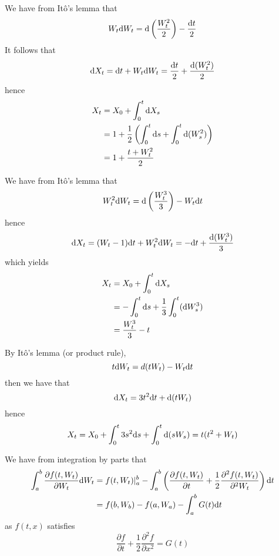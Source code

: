 \documentclass{homework}
\begin{document}
    \problem
    \begin{subproblem}[(\alph*)]
        \item
        We have from It\^o's lemma that
        \[W_t\mathrm d W_t=\mathrm d\left(\frac{W_t^2}{2}\right)-\frac{\mathrm d t}{2}\]
        It follows that
        \[\mathrm d X_t=\mathrm d t+W_t\mathrm d W_t=\frac{\mathrm d t}{2}+\frac{\mathrm d (W_t^2)}{2}\]
        hence
        \[\begin{aligned}
            X_t&=X_0+\int_0^t\mathrm d X_s\\
            &=1+\frac{1}{2}\left(\int_0^t\mathrm d s+\int_0^t\mathrm d(W_s^2)\right)\\
            &=1+\frac{t+W_t^2}{2}
        \end{aligned}\]

        \item
        We have from It\^o's lemma that
        \[W_t^2\mathrm d W_t=\mathrm d\left(\frac{W_t^3}{3}\right)-W_t\mathrm d t\]
        hence
        \[\mathrm d X_t=(W_t-1)\mathrm d t+W_t^2\mathrm d W_t=-\mathrm d t+\frac{\mathrm d(W_t^3)}{3}\]
        which yields
        \[\begin{aligned}
            X_t&=X_0+\int_0^t\mathrm d X_s\\
            &=-\int_0^t\mathrm d s+\frac{1}{3}\int_0^t(\mathrm d W_s^3)\\
            &=\frac{W_t^3}{3}-t
        \end{aligned}\]

        \item
        By It\^o's lemma (or product rule),
        \[t\mathrm d W_t=d(tW_t)-W_t\mathrm d t\]
        then we have that
        \[\mathrm d X_t=3t^2\mathrm d t+\mathrm d(tW_t)\]
        hence
        \[X_t=X_0+\int_0^t3s^2\mathrm d s+\int_0^t\mathrm d (sW_s)=t(t^2+W_t)\]
    \end{subproblem}

    \problem
    We have from integration by parts that
    \[\begin{aligned}
        \int_a^b\frac{\partial f(t,W_t)}{\partial W_t}\mathrm d W_t
        &=f(t,W_t)|_a^b
        -\int_a^b\left(\frac{\partial f(t,W_t)}{\partial t}
        +\frac{1}{2}\frac{\partial^2 f(t,W_t)}{\partial^2 W_t}\right)
        \mathrm d t\\
        &=f(b,W_b)-f(a,W_a)-\int_a^bG(t)\mathrm d t
    \end{aligned}\]
    as $f(t,x)$ satisfies
    \[\frac{\partial f}{\partial t}+\frac{1}{2}\frac{\partial^2 f}{\partial x^2}=G(t)\]
\end{document}
